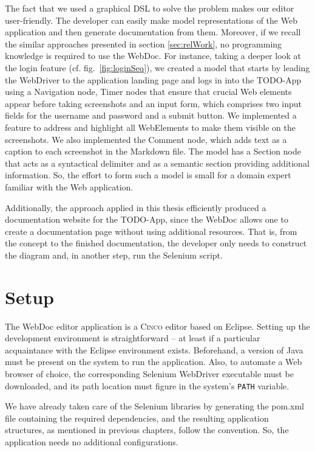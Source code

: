 The fact that we used a graphical DSL to solve the problem makes our editor user-friendly. The developer can easily make model representations of the Web application and then generate documentation from them. Moreover, if we recall the similar approaches presented in section \ref{sec:relWork}, no programming knowledge is required to use the WebDoc. For instance, taking a deeper look at the login feature (cf. fig.~\ref{fig:loginSeq}), we created a model that starts by leading the WebDriver to the application landing page and logs in into the TODO-App using a Navigation node, Timer nodes that ensure that crucial Web elements appear before taking screenshots and an input form, which comprises two input fields for the username and password and a submit button. We implemented a feature to address and highlight all WebElements to make them visible on the screenshots. We also implemented the Comment node, which adds text as a caption to each screenshot in the Markdown file. The model has a Section node that acts as a syntactical delimiter and as a semantic section providing additional information. So, the effort to form such a model is small for a domain expert familiar with the Web application.

Additionally, the approach applied in this thesis efficiently produced a documentation website for the TODO-App, since the WebDoc allows one to create a documentation page without using additional resources. That is, from the concept to the finished documentation, the developer only needs to construct the diagram and, in another step, run the Selenium script.

\section{Setup}\label{sec:setup}

The WebDoc editor application is a \textsc{Cinco} editor based on Eclipse. Setting up the development environment is straightforward -- at least if a particular acquaintance with the Eclipse environment exists. Beforehand, a version of Java must be present on the system to run the application. Also, to automate a Web browser of choice, the corresponding Selenium WebDriver executable must be downloaded, and its path location must figure in the system's \lstinline{PATH} variable.

We have already taken care of the Selenium libraries by generating the pom.xml file containing the required dependencies, and the resulting application structures, as mentioned in previous chapters, follow the convention. So, the application needs no additional configurations.

